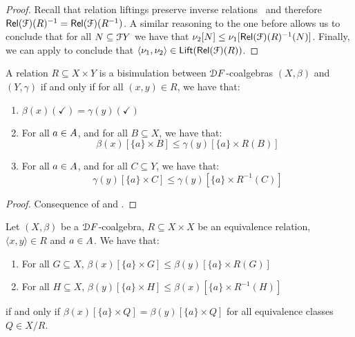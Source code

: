 \begin{proof}
Recall that relation liftings preserve inverse relations~\cite{Hughes:2004:Simulations} and therefore ${\mathsf{Rel}}(\mathcal{F})(R)^{-1} = {\mathsf{Rel}}(\mathcal{F})(R^{-1})$. A similar reasoning to the one before allows us to conclude that for all $N \subseteq \mathcal{F} Y$ we have that 
$\nu_2[N] \leq \nu_1[{\mathsf{Rel}}(\mathcal{F})(R)^{-1}(N)]$. Finally, we can apply  to conclude that $\langle \nu_1 , \nu_2 \rangle \in \mathsf{Lift}({\mathsf{Rel}}(\mathcal{F})(R))$.
\end{proof}

\begin{lemma}\label{apx:lem:characterisation_of_bisimulation}
    A relation ${R} \subseteq {X \times Y}$ is a bisimulation between $\mathcal{D} F$-coalgebras $(X, \beta)$ and $(Y, \gamma)$ if and only if for all $(x,y) \in R$, we have that:
    \begin{enumerate}
        \item $\beta(x)(\checkmark) = \gamma(y)(\checkmark)$
        \item For all $a \in {A}$, and for all $B \subseteq X$, we have that: $$\beta(x)[\{a\} \times B] \leq \gamma(y)[\{a\} \times R(B)]  $$
        \item For all $a \in {A}$, and for all $C \subseteq Y$, we have that: $$\gamma(y)[\{a\} \times C] \leq \gamma(y)[\{a\} \times R^{-1}(C)]  $$ 
    \end{enumerate}
\end{lemma}
\begin{proof}
    Consequence of  and .
\end{proof}
\begin{lemma}\label{apx:lem:simpler_characterisation}
    Let $(X, \beta)$ be a $\mathcal{D} F$-coalgebra, $R \subseteq {X \times X}$ be an equivalence relation, $\langle x,y \rangle \in R$ and $a \in {A}$.
    We have that: 
    \begin{enumerate}
        \item For all $G \subseteq X$, $\beta(x)[\{a\} \times G] \leq \beta(y)[\{a\} \times R(G)]$
        \item For all $H \subseteq X$, $\beta(y)[\{a\} \times H] \leq \beta(x)[\{a\} \times R^{-1}(H)]$
    \end{enumerate}
    if and only if $\beta(x)[\{a\} \times Q] = \beta(y)[\{a\} \times Q]$ for all equivalence classes $Q \in X/R$.
\end{lemma}
